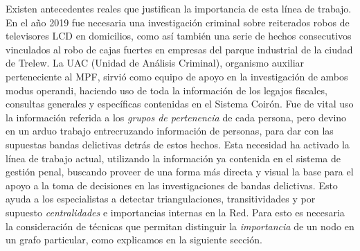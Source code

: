 Existen antecedentes reales que justifican la importancia de esta línea de trabajo. 
En el año 2019 fue necesaria una investigación criminal sobre reiterados robos de televisores LCD en domicilios, como así también una serie de hechos consecutivos vinculados al robo de cajas fuertes en empresas del parque industrial de la ciudad de Trelew.
La UAC (Unidad de Análisis Criminal), organismo auxiliar perteneciente al MPF, sirvió como equipo de apoyo en la investigación de ambos modus operandi, haciendo uso de toda la información de los legajos fiscales, consultas generales y específicas contenidas en el Sistema Coirón. Fue de vital uso la información referida a los \textit{grupos de pertenencia} de cada persona, pero devino en un arduo trabajo entrecruzando información de personas, para dar con las supuestas bandas delictivas detrás de estos hechos.
Esta necesidad ha activado la línea de trabajo actual, utilizando la información ya contenida en el sistema de gestión penal, buscando proveer de una forma más directa y visual la base para el apoyo a la toma de decisiones en las investigaciones de bandas delictivas. 
Esto ayuda a los especialistas a detectar triangulaciones, transitividades y por supuesto \textit{centralidades} e importancias internas en la Red. 
Para esto es necesaria la consideración de técnicas que permitan distinguir la \textit{importancia} de un nodo en un grafo particular, como explicamos en la siguiente sección.